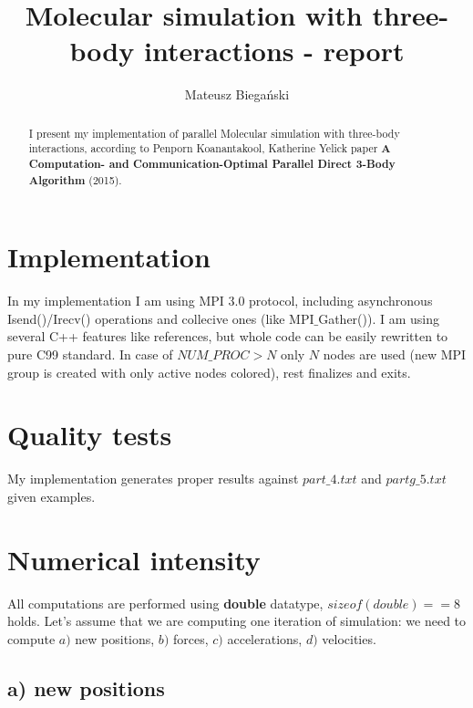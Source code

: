 \documentclass[12pt]{article}
\begin{document}

\author{Mateusz Biegański}
\title{ Molecular simulation with three-body interactions - report}
\maketitle

\begin{abstract}
    \par I present my implementation of parallel Molecular simulation with three-body interactions, according to Penporn Koanantakool, Katherine Yelick paper \textbf{A Computation- and Communication-Optimal Parallel Direct 3-Body Algorithm} (2015).
\end{abstract}


\section*{\fontsize{18}{18}\selectfont Implementation}

In my implementation I am using MPI 3.0 protocol, including asynchronous Isend()/Irecv() operations and collecive ones (like MPI$\_$Gather()). I am using several C++ features like references, but whole code can be easily rewritten to pure C99 standard. In case of $NUM\_PROC > N$ only $N$ nodes are used (new MPI group is created with only active nodes colored), rest finalizes and exits.

\section*{\fontsize{18}{18}\selectfont Quality tests}
My implementation generates proper results against $part\_4.txt$ and $partg\_5.txt$ given examples.

\section*{\fontsize{18}{18}\selectfont Numerical intensity}

All computations are performed using \textbf{double} datatype, $sizeof(double) == 8$ holds.
Let's assume that we are computing one iteration of simulation: we need to compute $a)$ new positions, $b)$ forces, $c)$ accelerations, $d)$ velocities.

\subsection*{a) new positions}
\end{document}
